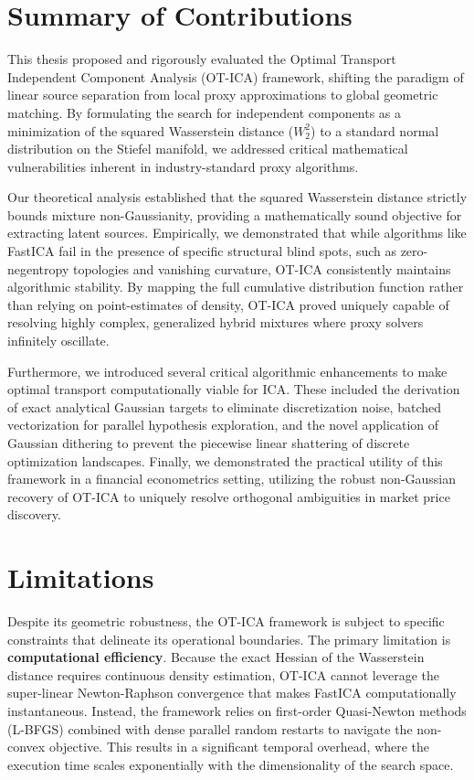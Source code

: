 \documentclass[12pt,a4paper,twoside,openany]{book}
\begin{document}
\section{Summary of Contributions}
This thesis proposed and rigorously evaluated the Optimal Transport Independent Component Analysis (OT-ICA) framework, shifting the paradigm of linear source separation 
from local proxy approximations to global geometric matching. By formulating the search for independent components as a minimization of the squared Wasserstein distance ($W_2^2$) 
to a standard normal distribution on the Stiefel manifold, we addressed critical mathematical vulnerabilities inherent in industry-standard proxy algorithms.

Our theoretical analysis established that the squared Wasserstein distance strictly bounds mixture non-Gaussianity, providing a mathematically sound objective for extracting latent sources. 
Empirically, we demonstrated that while algorithms like FastICA fail in the presence of specific structural blind spots, such as zero-negentropy topologies 
and vanishing curvature, OT-ICA consistently maintains algorithmic stability. By mapping the full cumulative distribution function rather than relying on point-estimates of density, 
OT-ICA proved uniquely capable of resolving highly complex, generalized hybrid mixtures where proxy solvers infinitely oscillate.

Furthermore, we introduced several critical algorithmic enhancements to make optimal transport computationally viable for ICA. These included the derivation of exact analytical Gaussian 
targets to eliminate discretization noise, batched vectorization for parallel hypothesis exploration, and the novel application of Gaussian dithering to prevent 
the piecewise linear shattering of discrete optimization landscapes. Finally, we demonstrated the practical utility of this framework in a financial econometrics setting, 
utilizing the robust non-Gaussian recovery of OT-ICA to uniquely resolve orthogonal ambiguities in market price discovery.

\section{Limitations}
Despite its geometric robustness, the OT-ICA framework is subject to specific constraints that delineate its operational boundaries. 
The primary limitation is \textbf{computational efficiency}. Because the exact Hessian of the Wasserstein distance requires continuous density estimation, 
OT-ICA cannot leverage the super-linear Newton-Raphson convergence that makes FastICA computationally instantaneous. Instead, the framework relies on first-order 
Quasi-Newton methods (L-BFGS) combined with dense parallel random restarts to navigate the non-convex objective. This results in a significant temporal overhead, 
where the execution time scales exponentially with the dimensionality of the search space.
\end{document}
